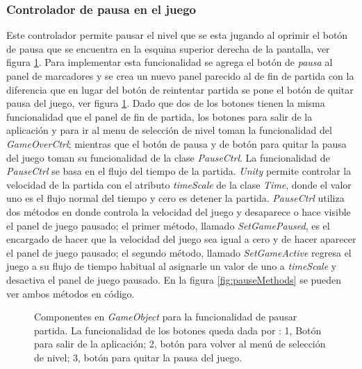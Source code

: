 \subsubsection{Controlador de pausa en el juego}
Este controlador permite pausar el nivel que se esta jugando al oprimir el botón 
de pausa que se encuentra en la esquina superior derecha de la pantalla, ver 
figura \ref{fig:PausedFuctionality}. Para implementar esta funcionalidad se 
agrega el botón de \textit{pausa} al panel de marcadores y se crea un nuevo 
panel parecido al de fin de partida con la diferencia que en lugar del botón de 
reintentar partida se pone el botón de quitar pausa del juego, ver figura 
\ref{fig:PausedFuctionality}. Dado que dos de los botones tienen la misma 
funcionalidad que el panel de fin de partida, los botones para salir de la 
aplicación y para ir al menu de selección de nivel toman la funcionalidad del 
\textit{GameOverCtrl}; mientras que el botón de pausa y de botón para quitar la 
pausa del juego toman su funcionalidad de la clase \textit{PauseCtrl}. La 
funcionalidad de \textit{PauseCtrl} se basa en el flujo del tiempo de la 
partida. \textit{Unity} permite controlar la velocidad de la partida con el 
atributo \textit{timeScale} de la clase \textit{Time}, donde el valor uno es el 
flujo normal del tiempo y cero es detener la partida. \textit{PauseCtrl} utiliza 
dos métodos en donde controla la velocidad del juego y desaparece o hace visible 
el panel de juego pausado; el primer método, llamado \textit{SetGamePaused}, es 
el encargado de hacer que la velocidad del juego sea igual a cero y de hacer 
aparecer el panel de juego pausado; el segundo método, llamado 
\textit{SetGameActive} regresa el juego a su flujo de tiempo habitual al 
asignarle un valor de uno a \textit{timeScale} y desactiva el panel de juego 
pausado. En la figura \ref{fig:pauseMethods} se pueden ver ambos métodos en 
código. 

\begin{figure}
  \centering
   
 	

  \caption{Componentes en \textit{GameObject} para la funcionalidad de pausar 
  partida. La funcionalidad de los botones queda dada por : 1, Botón para salir 
  de la aplicación; 2, botón para volver al menú de selección de nivel; 3, botón 
  para quitar la pausa del juego. }
  \label{fig:PausedFuctionality}
\end{figure} 


